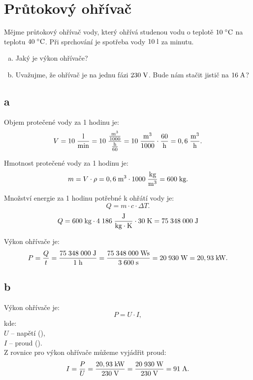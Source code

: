 \documentclass{article}
\begin{document}
\newpage



\section{ Průtokový ohřívač \spicy}
Mějme průtokový ohřívač vody, který ohřívá studenou vodu o teplotě $10 \; ^\circ \textrm{C}$ \fs na teplotu $40 \; ^\circ \textrm{C}$. Při sprchování je spotřeba vody $10 \; \textrm{l}$ za minutu.

\begin{enumerate}[a)]
    \item Jaký je výkon ohřívače?
    \item Uvažujme, že ohřívač je na jednu fázi $230 \; \textrm{V}$. Bude nám stačit jistič na $16 \; \textrm{A}$?
\end{enumerate}


\subsection{a}

Objem protečené vody za 1 hodinu je:
$$
    V = 10 \; \frac{\textrm{l}}{\textrm{min}} = 10 \; \frac{\frac{\textrm{m}^{\textrm{3}}}{1000}}{\frac{\textrm{h}}{60}} = 10 \; \frac{\textrm{m}^{\textrm{3}}}{1000} \cdot \frac{60}{\textrm{h}} = 0,6 \; \frac{\textrm{m}^{\textrm{3}}}{\textrm{h}}.
$$

Hmotnost protečené vody za 1 hodinu je:
$$
    m = V \cdot \rho = 0,6 \; \textrm{m}^{\textrm{3}} \cdot 1 000 \; \frac{\textrm{kg}}{\textrm{m}^{\textrm{3}}} = 600 \; \textrm{kg}.
$$

Množství energie za 1 hodinu potřebné k ohřátí vody je:
$$
    Q = m \cdot c \cdot \Delta T.
$$
$$
    Q = 600 \; \textrm{kg} \cdot 4 \; 186 \; \frac{\textrm{J}}{\textrm{kg} \cdot \textrm{K}} \cdot 30 \; \textrm{K} = 75 \; 348 \; 000 \; \textrm{J}
$$

Výkon ohřívače je:
$$
    P = \frac{Q}{t} = \frac{75 \; 348 \; 000 \; \textrm{J}}{1 \; \textrm{h}} = \frac{75 \; 348 \; 000 \; \textrm{Ws}}{3 \; 600 \; \textrm{s}} = 20 \; 930 \; \textrm{W} = 20,93 \; \textrm{kW}.
$$


\subsection{b}

Výkon ohřívače je:
$$
    P = U \cdot I,
$$
kde:\\
$U$ -- napětí (\ueqV),\\
$I$ -- proud (\ueqA).\\

Z rovnice pro výkon ohřívače můžeme vyjádřit proud:
$$
    I = \frac{P}{U} = \frac{20,93 \; \textrm{kW}}{230 \; \textrm{V}} = \frac{20 \; 930 \; \textrm{W}}{230 \; \textrm{V}} = 91 \; \textrm{A}.
$$
\end{document}

